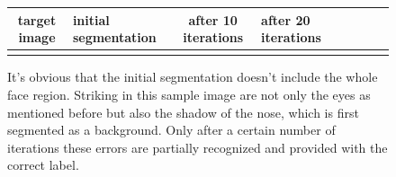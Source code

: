 \begin{figure}[h]
	\begin{center}
		\begin{tabular}{SC|SC|SC|SC}
			 target image & initial segmentation & after 10 iterations & after 20 iterations\\ \hline
			 &
			 &
			 &
			 \\
		\end{tabular}
	\end{center}
	\caption{It's obvious that the initial segmentation doesn't include the whole face region. Striking in this sample image are not only the eyes as mentioned before but also the shadow of the nose, which is first segmented as a background. Only after a certain number of iterations these errors are partially recognized and provided with the correct label.}
	\label{fig:iterations}
\end{figure}

